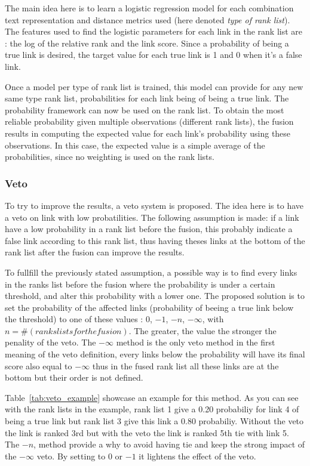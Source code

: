 The main idea here is to learn a logistic regression model for each combination text representation and distance metrics used (here denoted \textit{type of rank list}).
The features used to find the logistic parameters for each link in the rank list are : the log of the relative rank and the link score.
Since a probability of being a true link is desired, the target value for each true link is 1 and 0 when it's a false link.

Once a model per type of rank list is trained, this model can provide for any new same type rank list, probabilities for each link being of being a true link.
The probability framework can now be used on the rank list.
To obtain the most reliable probability given multiple observations (different rank lists), the fusion results in computing the expected value for each link's probability using these observations.
In this case, the expected value is a simple average of the probabilities, since no weighting is used on the rank lists.

\subsubsection{Veto}

To try to improve the results, a veto system is proposed.
The idea here is to have a veto on link with low probatilities.
The following assumption is made: if a link have a low probability in a rank list before the fusion, this probably indicate a false link according to this rank list, thus having theses links at the bottom of the rank list after the fusion can improve the results.

To fullfill the previously stated assumption, a possible way is to find every links in the ranks list before the fusion where the probability is under a certain threshold, and alter this probability with a lower one.
The proposed solution is to set the probability of the affected links (probability of beeing a true link below the threshold) to one of these values : $0$, $-1$, $-n$, $-\infty$, with $n = \#(ranks lists for the fusion)$.
The greater, the value the stronger the penality of the veto.
The $-\infty$ method is the only veto method in the first meaning of the veto definition, every links below the probability will have its final score also equal to $-\infty$ thus in the fused rank list all these links are at the bottom but their order is not defined.

Table~\ref{tab:veto_example} showcase an example for this method.
As you can see with the rank lists in the example, rank list 1 give a 0.20 probabiliy for link 4 of being a true link but rank list 3 give this link a 0.80 probabiliy.
Without the veto the link is ranked 3rd but with the veto the link is ranked 5th tie with link 5.
The $-n$, method provide a why to avoid having tie and keep the strong impact of the $-\infty$ veto.
By setting to $0$ or $-1$ it lightens the effect of the veto.

